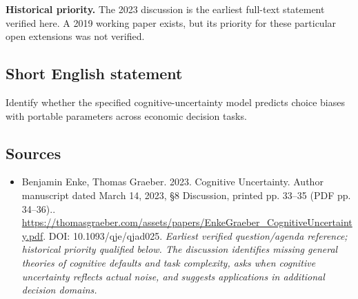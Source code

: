 \documentclass[11pt]{article}
\begin{document}
\par\textbf{Historical priority.} The 2023 discussion is the earliest full-text statement verified here. A 2019 working paper exists, but its priority for these particular open extensions was not verified.

\subsection{Short English statement}
Identify whether the specified cognitive-uncertainty model predicts choice biases with portable parameters across economic decision tasks.

\subsection{Sources}
\begin{itemize}\raggedright
\item[\textnormal{[S1]}]\hypertarget{source:30007583:1}{} Benjamin Enke, Thomas Graeber. 2023. Cognitive Uncertainty. Author manuscript dated March 14, 2023, §8 Discussion, printed pp. 33–35 (PDF pp. 34–36)..
\url{https://thomasgraeber.com/assets/papers/EnkeGraeber_CognitiveUncertainty.pdf}.
DOI: 10.1093/qje/qjad025.
{\small\textit{Earliest verified question/agenda reference; historical priority qualified below. The discussion identifies missing general theories of cognitive defaults and task complexity, asks when cognitive uncertainty reflects actual noise, and suggests applications in additional decision domains.}}
\end{itemize}
\end{document}
